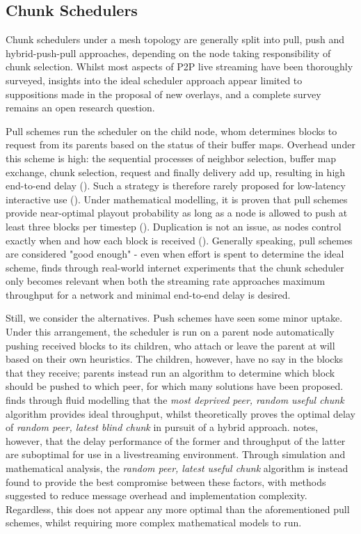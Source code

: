 \documentclass[12pt,a4paper]{article}
\begin{document}
\subsection{Chunk Schedulers} \label{litreview:schedulers}
Chunk schedulers under a mesh topology are generally split into pull, push and hybrid-push-pull approaches, depending on the node taking responsibility of chunk selection. Whilst most aspects of P2P live streaming have been thoroughly surveyed, insights into the ideal scheduler approach appear limited to suppositions made in the proposal of new overlays, and a complete survey remains an open research question.

Pull schemes run the scheduler on the child node, whom determines blocks to request from its parents based on the status of their buffer maps. Overhead under this scheme is high: the sequential processes of neighbor selection, buffer map exchange, chunk selection, request and finally delivery add up, resulting in high end-to-end delay (\cite{Hei2008a}). Such a strategy is therefore rarely proposed for low-latency interactive use (\cite{Zhang2007}). Under mathematical modelling, it is proven that pull schemes provide near-optimal playout probability as long as a node is allowed to push at least three blocks per timestep (\cite{Zhang2014}). Duplication is not an issue, as nodes control exactly when and how each block is received (\cite{LoCigno2008}). Generally speaking, pull schemes are considered "good enough" - even when effort is spent to determine the ideal scheme, \cite{Liang2009} finds through real-world internet experiments that the chunk scheduler only becomes relevant when both the streaming rate approaches maximum throughput for a network and minimal end-to-end delay is desired.

Still, we consider the alternatives. Push schemes have seen some minor uptake. Under this arrangement, the scheduler is run on a parent node automatically pushing received blocks to its children, who attach or leave the parent at will based on their own heuristics. The children, however, have no say in the blocks that they receive; parents instead run an algorithm to determine which block should be pushed to which peer, for which many solutions have been proposed. \cite{Massoulie2007} finds through fluid modelling that the \textit{most deprived peer, random useful chunk} algorithm provides ideal throughput, whilst \cite{Sanghavi2006} theoretically proves the optimal delay of \textit{random peer, latest blind chunk} in pursuit of a hybrid approach. \cite{Bonald2008} notes, however, that the delay performance of the former and throughput of the latter are suboptimal for use in a livestreaming environment. Through simulation and mathematical analysis, the \textit{random peer, latest useful chunk} algorithm is instead found to provide the best compromise between these factors, with methods suggested to reduce message overhead and implementation complexity. Regardless, this does not appear any more optimal than the aforementioned pull schemes, whilst requiring more complex mathematical models to run.
\end{document}
